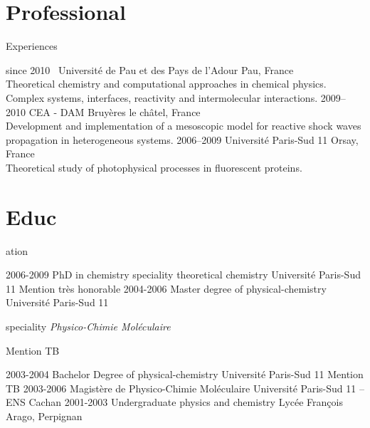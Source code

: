 \documentclass{cv-style}     %
\begin{document}
\vspace{-2mm}
\section{Professional }{Experiences}
\vspace{-0.3cm}

\begin{entrylist}
\entry
  {since 2010~}
  {Université de Pau et des Pays de l'Adour}
  {Pau, France}
  {\\
   Theoretical chemistry and computational approaches in chemical physics.
   Complex systems, interfaces, reactivity and intermolecular interactions.}
\entry
  {2009--2010}
  {CEA - DAM}
  {Bruyères le châtel, France}
  {
  \\
  Development and implementation of a mesoscopic model for reactive shock waves
  propagation in heterogeneous systems.
  }
\entry
  {2006--2009}
  {Université Paris-Sud 11}
  {Orsay, France}
  {
  \\
  Theoretical study of photophysical processes in fluorescent proteins.
  }
\end{entrylist}

\vspace{-5mm}
\section{Educ}{ation}
\vspace{-0.2cm}

\begin{entrylist}
\entry
{2006-2009}
{PhD in chemistry {\normalfont speciality theoretical chemistry}}
{Université Paris-Sud 11}
{Mention très honorable}
\entry
{2004-2006}
{Master degree of physical-chemistry}
{Université Paris-Sud 11}
{{\normalfont speciality \textit{Physico-Chimie Moléculaire}}\par Mention TB}
\entry
{2003-2004}
{Bachelor Degree of physical-chemistry}
{Université Paris-Sud 11}
{Mention TB}
\entry
{2003-2006}
{Magistère de Physico-Chimie Moléculaire}
{Université Paris-Sud 11 -- ENS Cachan}
{\vspace{-4mm}}
\entry
{2001-2003}
{Undergraduate {\normalfont physics and chemistry}}
{Lycée François Arago, Perpignan}
{}
\end{entrylist}
\end{document}

